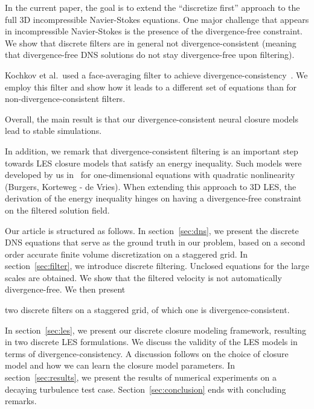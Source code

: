 \documentclass[preprint]{elsarticle}
\newcommand{\R}[1]{}
\newcommand{\revone}[1]{#1}
\begin{document}
In the current paper, the goal is to extend the ``discretize first'' approach to
the full 3D incompressible Navier-Stokes equations. One major challenge that
appears in incompressible Navier-Stokes is the presence of the divergence-free
constraint. We show that discrete filters are in general not
divergence-consistent (meaning that divergence-free DNS solutions do not stay
divergence-free upon filtering).
\revone{
    \R{novel1}
    
    Kochkov et al.\ used a face-averaging filter to achieve
    divergence-consistency~\cite{Kochkov2021}. We employ this filter and show
    how it leads to a different set of equations than for
    non-divergence-consistent filters.
}
Overall, the main result is that our divergence-consistent neural
closure models lead to stable simulations.

In addition, we remark that divergence-consistent filtering is an important step
towards LES closure models that satisfy an energy inequality. Such models were
developed by us in~\cite{Vangastelen2023} for one-dimensional equations with
quadratic nonlinearity (Burgers, Korteweg - de Vries). When extending this
approach to 3D LES, the derivation of the energy inequality hinges on having a
divergence-free constraint on the filtered solution field. 

Our article is structured as follows. In section~\ref{sec:dns}, we present the
discrete DNS equations that serve as the ground truth in our problem, based on a
second order accurate finite volume discretization on a staggered grid. In
section~\ref{sec:filter}, we introduce discrete filtering. Unclosed equations
for the large scales are obtained. We show that the filtered velocity is not
automatically divergence-free. We then present
\revone{
    \R{novel2}
    
    two discrete filters on a staggered grid, of which one is
    divergence-consistent.
}
In section~\ref{sec:les}, we present our
discrete closure modeling framework, resulting in two discrete LES formulations.
We discuss the validity of the LES models in terms of divergence-consistency. A
discussion follows on the choice of closure model and how we can learn the
closure model parameters. In section~\ref{sec:results}, we present the results
of numerical experiments on a decaying turbulence test case.
Section~\ref{sec:conclusion} ends with concluding remarks.
\end{document}
